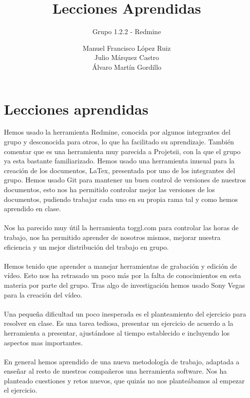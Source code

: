 \documentclass[a4paper,10pt]{scrartcl}
\title{Lecciones Aprendidas}
\subtitle{Grupo 1.2.2 - Redmine}
\author{
		Manuel Francisco López Ruiz\\
		Julio Márquez Castro\\
		Álvaro Martín Gordillo\\
		  }
\begin{document}
\clearpage\maketitle
\thispagestyle{empty}
\newpage




\section{Lecciones aprendidas}

Hemos usado la herramienta Redmine, conocida por algunos integrantes del grupo y desconocida para otros, lo que ha facilitado su aprendizaje. También comentar que es una herramienta muy parecida a Projetsii, con la que el grupo ya esta bastante familiarizado. Hemos usado una herramienta inusual para la creación de los documentos, LaTex, presentada por uno de los integrantes del grupo. Hemos usado Git para mantener un buen control de versiones de nuestros documentos, esto nos ha permitido controlar mejor las versiones de los documentos, pudiendo trabajar cada uno en su propia rama tal y como hemos aprendido en clase.\\\\

Nos ha parecido muy útil la herramienta toggl.com para controlar las horas de trabajo, nos ha permitido aprender de nosotros mismos, mejorar nuestra eficiencia y un mejor distribución del trabajo en grupo. \\\\

Hemos tenido que aprender a manejar herramientas de grabación y edición de vídeo. Esto nos ha retrasado un poco más por la falta de conocimientos en esta materia por parte del grupo. Tras algo de investigación hemos usado Sony Vegas para la creación del vídeo. \\\\

Una pequeña dificultad un poco inesperada es el planteamiento del ejercicio para resolver en clase. Es una tarea tediosa, presentar un ejercicio de acuerdo a la herramienta a presentar, ajustándose al tiempo establecido e incluyendo los aspectos mas importantes. \\\\

En general hemos aprendido de una nueva metodología de trabajo, adaptada a enseñar al resto de nuestros compañeros una herramienta software. Nos ha planteado cuestiones y retos nuevos, que quizás no nos planteábamos al empezar el ejercicio. 



\end{document}
